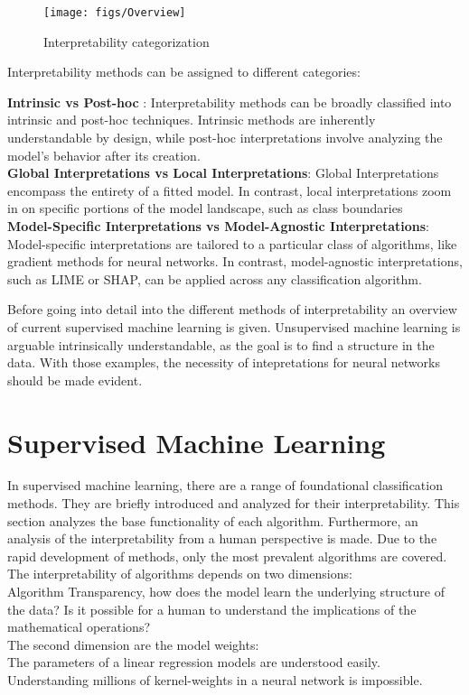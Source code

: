 \begin{figure}[h!]
	\centering
	\texttt{[image: figs/Overview]}
	\caption[Interpretability categorization]{Interpretability categorization \cite{allen2023interpretable}}
	\label{fig:IML_Overview}
\end{figure}

Interpretability methods can be assigned to different categories: \cite{allen2023interpretable} \cite{molnar2022}

\textbf{Intrinsic vs Post-hoc} : Interpretability methods can be broadly classified into intrinsic and post-hoc techniques. Intrinsic methods are inherently understandable by design, while post-hoc interpretations involve analyzing the model's behavior after its creation.
\\
\textbf{Global Interpretations vs Local Interpretations}: Global Interpretations encompass the entirety of a fitted model. In contrast, local interpretations zoom in on specific portions of the model landscape, such as class boundaries
\\
\textbf{Model-Specific Interpretations vs Model-Agnostic Interpretations}: 
Model-specific interpretations are tailored to a particular class of algorithms, like gradient methods for neural networks. In contrast, model-agnostic interpretations, such as LIME or SHAP, can be applied across any classification algorithm.


Before going into detail into the different methods of interpretability an overview of current supervised machine learning is given. Unsupervised machine learning is arguable intrinsically understandable, as the goal is to find a structure in the data. \cite{allen2023interpretable} With those examples, the necessity of intepretations for neural networks should be made evident.

\section{Supervised Machine Learning}

In supervised machine learning, there are a range of foundational classification methods. They are briefly introduced and analyzed for their interpretability. This section analyzes the base functionality of each algorithm. Furthermore, an analysis of the interpretability from a human perspective is made. Due to the rapid development of methods, only the most prevalent algorithms are covered.
\\
The interpretability of algorithms depends on two dimensions:\\
 Algorithm Transparency, how does the model learn the underlying structure of the data? Is it possible for a human to understand the implications of the mathematical operations? \cite{molnar2022} \\ The second dimension are the model weights:\\ The parameters of a linear regression models are understood easily. Understanding millions of kernel-weights in a neural network is impossible.

